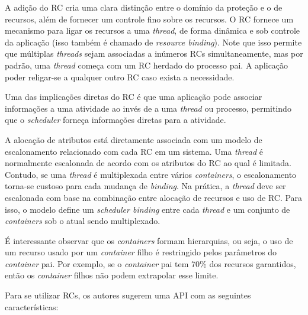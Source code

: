 A adição do RC cria uma clara distinção entre o domínio da proteção e o de
recursos, além de fornecer um controle fino sobre os recursos. O RC fornece um
mecanismo para ligar os recursos a uma \emph{thread}, de forma
dinâmica e sob controle da aplicação (isso também é chamado de \emph{resource
binding}). Note que isso permite que múltiplas \emph{threads} sejam associadas a
inúmeros RCs simultaneamente, mas por padrão, uma \emph{thread} começa com um RC
herdado do processo pai. A aplicação poder religar-se a qualquer outro RC
caso exista a necessidade.

Uma das implicações diretas do RC é que uma aplicação pode associar informações a
uma atividade ao invés de a uma \emph{thread} ou processo, permitindo que
o \emph{scheduler} forneça informações diretas para a atividade.

A alocação de atributos está diretamente associada com um modelo de
escalonamento relacionado com cada RC em um sistema. Uma \emph{thread} é normalmente
escalonada de acordo com os atributos do RC ao qual é limitada. Contudo, se uma
\emph{thread} é multiplexada entre vários \emph{containers}, o escalonamento torna-se custoso
para cada mudança de \textit{binding}. Na prática, a \emph{thread} deve ser escalonada com base
na combinação entre alocação de recursos e uso de RC. Para isso, o modelo
define um \emph{scheduler binding} entre cada \emph{thread} e um conjunto de \emph{containers}
sob o atual sendo multiplexado. 

É interessante observar que os \emph{containers} formam hierarquias, ou seja, o uso de
um recurso usado por um \emph{container} filho é restringido pelos parâmetros do
\emph{container} pai. Por exemplo, se o \emph{container} pai tem 70\% dos recursos
garantidos, então os \emph{container} filhos não podem extrapolar esse limite.

Para se utilizar RCs, os autores sugerem uma API com as seguintes
características:

